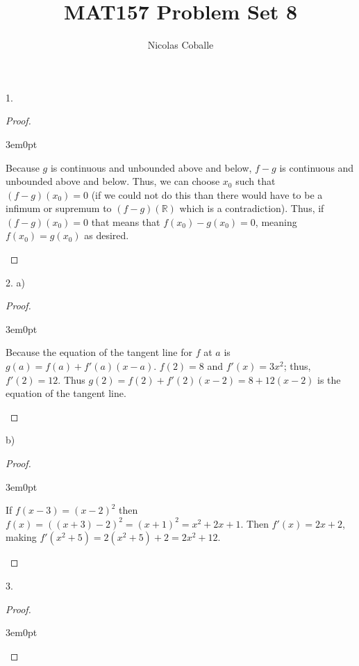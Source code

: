 \documentclass[11pt]{article}
\title{MAT157 Problem Set 8}
\author{Nicolas Coballe}
\newcommand{\R}{\mathbb{R}}
\newenvironment{myproof}
{\begin{proof} \begin{adjustwidth}{3em}{0pt}$ $\par\nobreak\ignorespaces}
{\end{adjustwidth} \end{proof}}
\begin{document}
\maketitle
\begin{flushleft}

1.

\begin{myproof}

Because $g$ is continuous and unbounded above and below, $f-g$ is continuous and unbounded above and below. Thus, we can choose $x_0$ such that $(f-g)(x_0) = 0$ (if we could not do this than there would have to be a infimum or supremum to $(f-g)(\R)$ which is a contradiction). Thus, if $(f-g)(x_0) = 0$ that means that $f(x_0) - g(x_0) = 0$, meaning $f(x_0) = g(x_0)$ as desired.

\end{myproof}

\newpage

2. a)

\begin{myproof}

Because the equation of the tangent line for $f$ at $a$ is $g(a) = f(a) + f'(a)(x-a)$. $f(2) = 8$ and $f'(x) = 3x^2$; thus, $f'(2) = 12$. Thus $g(2) = f(2) + f'(2)(x-2) = 8 + 12(x-2)$ is the equation of the tangent line.

\end{myproof}

b)

\begin{myproof}

If $f(x-3) = (x-2)^2$ then $f(x) = ((x+3)-2)^2 = (x+1)^2 = x^2 + 2x + 1$. Then $f'(x) = 2x + 2$, making $f'(x^2 + 5) = 2(x^2 + 5) + 2 = 2x^2 + 12$.

\end{myproof}

\newpage

3.

\begin{myproof}


\end{myproof}
\end{flushleft}
\end{document}
